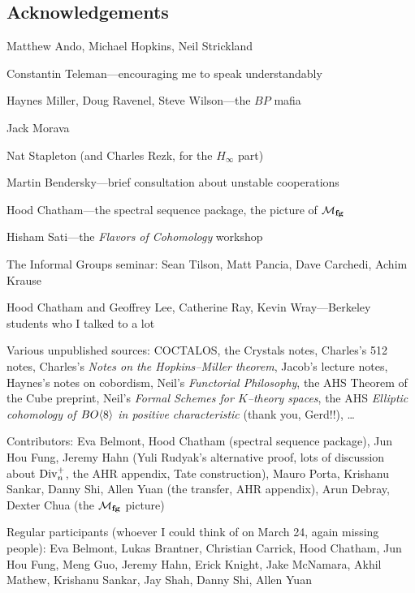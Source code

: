 


\newpage

\subsection*{Acknowledgements}

Matthew Ando, Michael Hopkins, Neil Strickland

Constantin Teleman---encouraging me to speak understandably

Haynes Miller, Doug Ravenel, Steve Wilson---the $BP$ mafia

Jack Morava

Nat Stapleton (and Charles Rezk, for the $H_\infty$ part)

Martin Bendersky---brief consultation about unstable cooperations

Hood Chatham---the spectral sequence package, the picture of $\mathcal{M}_{\mathbf{fg}}$

Hisham Sati---the \textit{Flavors of Cohomology} workshop

The Informal Groups seminar: Sean Tilson, Matt Pancia, Dave Carchedi, Achim Krause

Hood Chatham and Geoffrey Lee, Catherine Ray, Kevin Wray---Berkeley students who I talked to a lot

Various unpublished sources: COCTALOS, the Crystals notes, Charles's 512 notes, Charles's \textit{Notes on the Hopkins--Miller theorem}, Jacob's lecture notes, Haynes's notes on cobordism, Neil's \textit{Functorial Philosophy}, the AHS Theorem of the Cube preprint, Neil's \textit{Formal Schemes for $K$--theory spaces}, the AHS \textit{Elliptic cohomology of $BO\langle8\rangle$ in positive characteristic} (thank you, Gerd!!), \ldots





Contributors: Eva Belmont, Hood Chatham (spectral sequence package), Jun Hou Fung, Jeremy Hahn (Yuli Rudyak's alternative proof, lots of discussion about $\operatorname{Div}_n^+$, the AHR appendix, Tate construction), Mauro Porta, Krishanu Sankar, Danny Shi, Allen Yuan (the transfer, AHR appendix), Arun Debray, Dexter Chua (the $\mathcal{M}_{\mathbf{fg}}$ picture)

Regular participants (whoever I could think of on March 24, again missing people): Eva Belmont, Lukas Brantner, Christian Carrick, Hood Chatham, Jun Hou Fung, Meng Guo, Jeremy Hahn, Erick Knight, Jake McNamara, Akhil Mathew, Krishanu Sankar, Jay Shah, Danny Shi, Allen Yuan

